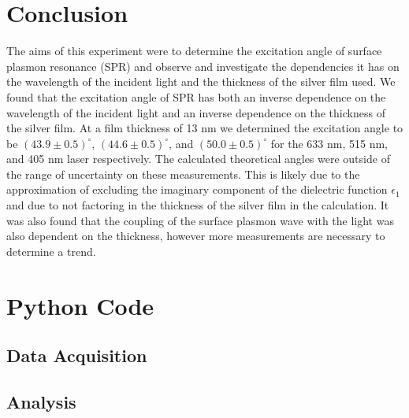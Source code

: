 \documentclass[%
reprint,
amsmath,amssymb,
aps,
]{revtex4-2}
\begin{document}
	\section{Conclusion}
		
		The aims of this experiment were to determine the excitation angle of surface plasmon resonance (SPR) and observe and investigate the dependencies it has on the wavelength of the incident light and the thickness of the silver film used. We found that the excitation angle of SPR has both an inverse dependence on the wavelength of the incident light and an inverse dependence on the thickness of the silver film.  At a film thickness of 13 nm we determined the excitation angle to be $(43.9\pm0.5)^\circ$, $(44.6\pm0.5)^\circ$, and $(50.0\pm0.5)^\circ$ for the 633 nm, 515 nm, and 405 nm laser respectively. The calculated theoretical angles were outside of the range of uncertainty on these measurements. This is likely due to the approximation of excluding the imaginary component of the dielectric function $\epsilon_1$ and due to not factoring in the thickness of the silver film in the calculation. It was also found that the coupling of the surface plasmon wave with the light was also dependent on the thickness, however more measurements are necessary to determine a trend.
		
		
	\clearpage
		
	\clearpage
	\appendix
		
	\section{Python Code}
	
		\subsection{Data Acquisition}
		
		\subsection{Analysis}
		
\end{document}
